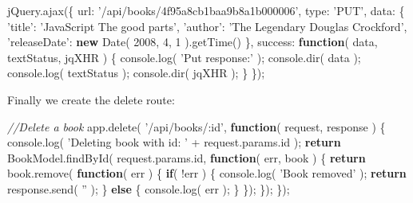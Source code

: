 \documentclass[9pt]{book}
\newenvironment{Shaded}{}{}
\newcommand{\KeywordTok}[1]{\textcolor[rgb]{0.00,0.44,0.13}{\textbf{{#1}}}}
\newcommand{\DataTypeTok}[1]{\textcolor[rgb]{0.56,0.13,0.00}{{#1}}}
\newcommand{\DecValTok}[1]{\textcolor[rgb]{0.25,0.63,0.44}{{#1}}}
\newcommand{\StringTok}[1]{\textcolor[rgb]{0.25,0.44,0.63}{{#1}}}
\newcommand{\CommentTok}[1]{\textcolor[rgb]{0.38,0.63,0.69}{\textit{{#1}}}}
\newcommand{\OtherTok}[1]{\textcolor[rgb]{0.00,0.44,0.13}{{#1}}}
\newcommand{\FunctionTok}[1]{\textcolor[rgb]{0.02,0.16,0.49}{{#1}}}
\newcommand{\NormalTok}[1]{{#1}}
\begin{document}
\begin{Shaded}
\begin{Highlighting}[]
\OtherTok{jQuery}\NormalTok{.}\FunctionTok{ajax}\NormalTok{(\{}
    \DataTypeTok{url}\NormalTok{: }\StringTok{'/api/books/4f95a8cb1baa9b8a1b000006'}\NormalTok{,}
    \DataTypeTok{type}\NormalTok{: }\StringTok{'PUT'}\NormalTok{,}
    \DataTypeTok{data}\NormalTok{: \{}
        \StringTok{'title'}\NormalTok{: }\StringTok{'JavaScript The good parts'}\NormalTok{,}
        \StringTok{'author'}\NormalTok{: }\StringTok{'The Legendary Douglas Crockford'}\NormalTok{,}
        \StringTok{'releaseDate'}\NormalTok{: }\KeywordTok{new} \FunctionTok{Date}\NormalTok{( }\DecValTok{2008}\NormalTok{, }\DecValTok{4}\NormalTok{, }\DecValTok{1} \NormalTok{).}\FunctionTok{getTime}\NormalTok{()}
    \NormalTok{\},}
    \DataTypeTok{success}\NormalTok{: }\KeywordTok{function}\NormalTok{( data, textStatus, jqXHR ) \{}
        \OtherTok{console}\NormalTok{.}\FunctionTok{log}\NormalTok{( }\StringTok{'Put response:'} \NormalTok{);}
        \OtherTok{console}\NormalTok{.}\FunctionTok{dir}\NormalTok{( data );}
        \OtherTok{console}\NormalTok{.}\FunctionTok{log}\NormalTok{( textStatus );}
        \OtherTok{console}\NormalTok{.}\FunctionTok{dir}\NormalTok{( jqXHR );}
    \NormalTok{\}}
\NormalTok{\});}
\end{Highlighting}
\end{Shaded}

Finally we create the delete route:

\begin{Shaded}
\begin{Highlighting}[]
\CommentTok{//Delete a book}
\OtherTok{app}\NormalTok{.}\FunctionTok{delete}\NormalTok{( }\StringTok{'/api/books/:id'}\NormalTok{, }\KeywordTok{function}\NormalTok{( request, response ) \{}
    \OtherTok{console}\NormalTok{.}\FunctionTok{log}\NormalTok{( }\StringTok{'Deleting book with id: '} \NormalTok{+ }\OtherTok{request}\NormalTok{.}\OtherTok{params}\NormalTok{.}\FunctionTok{id} \NormalTok{);}
    \KeywordTok{return} \OtherTok{BookModel}\NormalTok{.}\FunctionTok{findById}\NormalTok{( }\OtherTok{request}\NormalTok{.}\OtherTok{params}\NormalTok{.}\FunctionTok{id}\NormalTok{, }\KeywordTok{function}\NormalTok{( err, book ) \{}
        \KeywordTok{return} \OtherTok{book}\NormalTok{.}\FunctionTok{remove}\NormalTok{( }\KeywordTok{function}\NormalTok{( err ) \{}
            \KeywordTok{if}\NormalTok{( !err ) \{}
                \OtherTok{console}\NormalTok{.}\FunctionTok{log}\NormalTok{( }\StringTok{'Book removed'} \NormalTok{);}
                \KeywordTok{return} \OtherTok{response}\NormalTok{.}\FunctionTok{send}\NormalTok{( }\StringTok{''} \NormalTok{);}
            \NormalTok{\} }\KeywordTok{else} \NormalTok{\{}
                \OtherTok{console}\NormalTok{.}\FunctionTok{log}\NormalTok{( err );}
            \NormalTok{\}}
        \NormalTok{\});}
    \NormalTok{\});}
\NormalTok{\});}
\end{Highlighting}
\end{Shaded}
\end{document}
